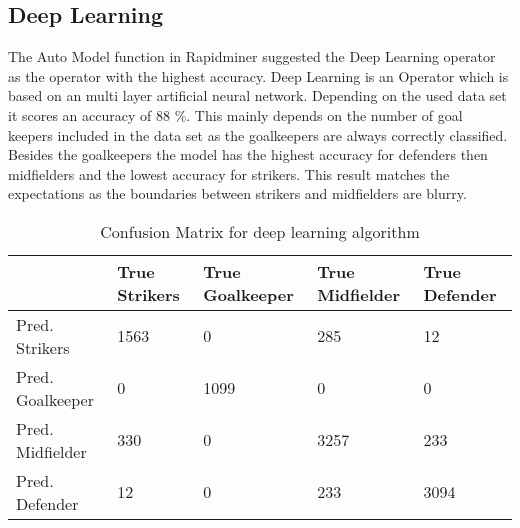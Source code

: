 \subsection{Deep Learning}

The Auto Model function in Rapidminer suggested the Deep Learning operator as the operator with the highest accuracy. Deep Learning is an Operator which is based on an multi layer artificial neural network. Depending on the used data set it scores an accuracy of 88 \%. This mainly depends on the number of goal keepers included in the data set as the goalkeepers are always correctly classified. Besides the goalkeepers the model has the highest accuracy for defenders then midfielders and the lowest accuracy for strikers. This result matches the expectations as the boundaries between strikers and midfielders are blurry. 


\begin{table}[]
\begin{tabular}{l|llll|}
\hline
                 & True Strikers & True Goalkeeper & True Midfielder & True Defender \\ \hline
Pred. Strikers   & 1563          & 0               & 285             & 12            \\
Pred. Goalkeeper & 0             & 1099            & 0               & 0             \\
Pred. Midfielder & 330           & 0               & 3257            & 233           \\
Pred. Defender   & 12            & 0               & 233             & 3094         
\end{tabular}
\label{Tab:DeepLearning}
\caption{Confusion Matrix for deep learning algorithm}
\end{table}
